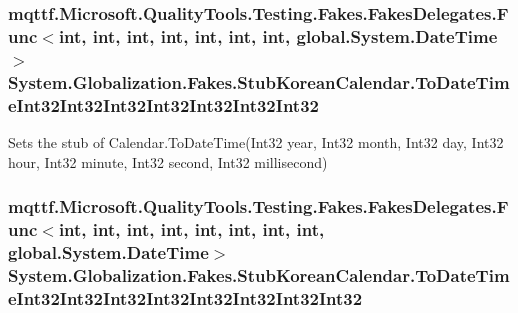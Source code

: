 \hypertarget{class_system_1_1_globalization_1_1_fakes_1_1_stub_korean_calendar_a81174b80fb4c0847b3d065388af25669}{
\subsubsection[{To\-Date\-Time\-Int32\-Int32\-Int32\-Int32\-Int32\-Int32\-Int32}]{\setlength{\rightskip}{0pt plus 5cm}mqttf.\-Microsoft.\-Quality\-Tools.\-Testing.\-Fakes.\-Fakes\-Delegates.\-Func$<$int, int, int, int, int, int, int, global.\-System.\-Date\-Time$>$ System.\-Globalization.\-Fakes.\-Stub\-Korean\-Calendar.\-To\-Date\-Time\-Int32\-Int32\-Int32\-Int32\-Int32\-Int32\-Int32}}\label{class_system_1_1_globalization_1_1_fakes_1_1_stub_korean_calendar_a81174b80fb4c0847b3d065388af25669}


Sets the stub of Calendar.\-To\-Date\-Time(\-Int32 year, Int32 month, Int32 day, Int32 hour, Int32 minute, Int32 second, Int32 millisecond)

\hypertarget{class_system_1_1_globalization_1_1_fakes_1_1_stub_korean_calendar_abf31e9beac585487d0a75b42be13c14d}{
\subsubsection[{To\-Date\-Time\-Int32\-Int32\-Int32\-Int32\-Int32\-Int32\-Int32\-Int32}]{\setlength{\rightskip}{0pt plus 5cm}mqttf.\-Microsoft.\-Quality\-Tools.\-Testing.\-Fakes.\-Fakes\-Delegates.\-Func$<$int, int, int, int, int, int, int, int, global.\-System.\-Date\-Time$>$ System.\-Globalization.\-Fakes.\-Stub\-Korean\-Calendar.\-To\-Date\-Time\-Int32\-Int32\-Int32\-Int32\-Int32\-Int32\-Int32\-Int32}}\label{class_system_1_1_globalization_1_1_fakes_1_1_stub_korean_calendar_abf31e9beac585487d0a75b42be13c14d}


